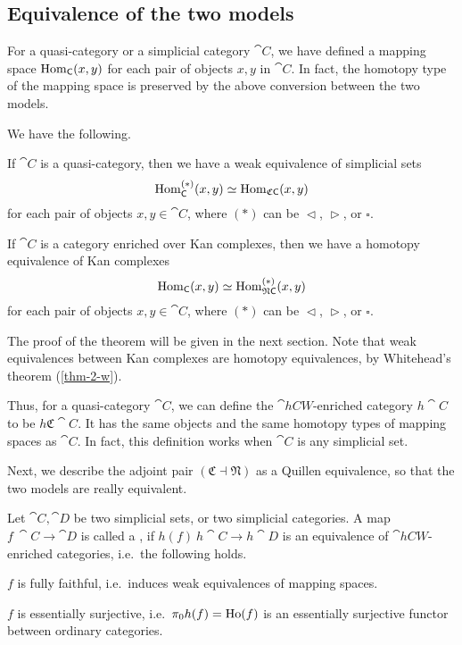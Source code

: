 \subsection{Equivalence of the two models}

For a quasi-category or a simplicial category $\cat C$,
we have defined a mapping space $\operatorname{Hom}_{\textup{\textsf{C}}}(x,y)$ for each
pair of objects $x,y$ in $\cat C$.
In fact, the homotopy type of the mapping space 
is preserved by the above conversion between the two models.

\begin{theorem}\label{thm-4-h}
    We have the following.
    \begin{itms}
        \item If $\cat C$ is a quasi-category,
        then we have a weak equivalence of simplicial sets 
        \[ \operatorname{Hom}_{\textup{\textsf{C}}}^{(*)}(x,y)\simeq\operatorname{Hom}_{\mathfrak C\textup{\textsf{C}}}(x,y) \]
        for each pair of objects $x,y\in\cat C$,
        where $(*)$ can be $\vartriangleleft$, $\vartriangleright$, or $\square$.
        \item If $\cat C$ is a category enriched over Kan complexes,
        then we have a homotopy equivalence of Kan complexes
        \[ \operatorname{Hom}_{\textup{\textsf{C}}}(x,y)\simeq\operatorname{Hom}_{\mathfrak N\textup{\textsf{C}}}^{(*)}(x,y) \]
        for each pair of objects $x,y\in\cat C$,
        where $(*)$ can be $\vartriangleleft$, $\vartriangleright$, or $\square$.
    \end{itms}
\end{theorem}

The proof of the theorem will be given in the next section.
Note that weak equivalences between Kan complexes
are homotopy equivalences,
by Whitehead's theorem (\ref{thm-2-w}).

Thus, for a quasi-category $\cat C$, we can define the 
$\cat{hCW}$-enriched category $h\cat C$ to be $h\mathfrak C\cat C$.
It has the same objects and the same homotopy types of mapping spaces as $\cat C$.
In fact, this definition works when $\cat C$ is any simplicial set.

Next, we describe the adjoint pair $(\mathfrak C\dashv\mathfrak N)$
as a Quillen equivalence,
so that the two models are really equivalent.

\begin{definition}
    Let $\cat C,\cat D$ be two simplicial sets, or two simplicial categories.
    A map $f\:\cat C\to\cat D$ is called a ,
    if $h(f)\:h\cat C\to h\cat D$
    is an equivalence of $\cat{hCW}$-enriched categories, i.e.\ the following holds.
    \begin{itms}
        \item $f$ is fully faithful, i.e.\ induces weak equivalences of mapping spaces.
        \item $f$ is essentially surjective, i.e.\ $\pi_0h(f)=\operatorname{Ho}(f)$
        is an essentially surjective functor between ordinary categories.
    \end{itms}
\end{definition}

